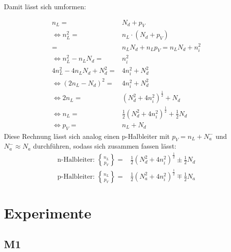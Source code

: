 Damit lässt sich umformen:

\begin{align*}
 n_L =& N_d + p_V \\
\Leftrightarrow  n_L^2 =& n_L \cdot (N_d +p_V) \\
 =& n_L N_d + n_L p_V = n_L N_d + n_i^2 \\
\Leftrightarrow  n_L^2-n_L N_d =& n_i^2 \\
4n_L^2-4n_L N_d + N_d^2 =& 4n_i^2 + N_d^2 \\
\Leftrightarrow (2n_L-N_d)^2 =& 4n_i^2+ N_d^2 \\
\Leftrightarrow 2n_L =& (N_d^2+4n_i^2)^{\frac{1}{2}} +N_d \\
\Leftrightarrow n_L =& \frac{1}{2}(N_d^2+4n_i^2)^{\frac{1}{2}} +\frac{1}{2} N_d \\
\Leftrightarrow p_V =& n_L + N_d
\end{align*}
Diese Rechnung lässt sich analog einen p-Halbleiter mit \(p_V = n_L + N_a^-\) und \(N_a^-\approx N_a\) durchführen, sodass sich zusammen fassen lässt:
\begin{align}
\text{n-Halbleiter:   }
\genfrac{\{}{\}}{0pt}{}{n_L}{p_V} =& \frac{1}{2}(N_d^2+4n_i^2)^{\frac{1}{2}} \pm \frac{1}{2} N_d \\
\text{p-Halbleiter:   }
\genfrac{\{}{\}}{0pt}{}{n_L}{p_V} =& \frac{1}{2}(N_a^2+4n_i^2)^{\frac{1}{2}} \mp \frac{1}{2} N_a
\end{align}

\section{Experimente}
\subsection{M1}

